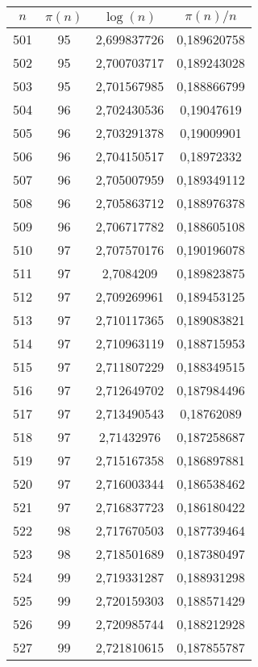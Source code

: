 {\begin{minipage}[!h]{0.45\textwidth}\centering
\tiny
\begin{longtable}{cccc} \hline
\(n\) & \(\pi(n)\) & \(\log(n)\) & \(\pi(n)/n\) \\ \hline
501 & 95 & 2,699837726 & 0,189620758 \\ \hline
502 & 95 & 2,700703717 & 0,189243028 \\ \hline
503 & 95 & 2,701567985 & 0,188866799 \\ \hline
504 & 96 & 2,702430536 & 0,19047619 \\ \hline
505 & 96 & 2,703291378 & 0,19009901 \\ \hline
506 & 96 & 2,704150517 & 0,18972332 \\ \hline
507 & 96 & 2,705007959 & 0,189349112 \\ \hline
508 & 96 & 2,705863712 & 0,188976378 \\ \hline
509 & 96 & 2,706717782 & 0,188605108 \\ \hline
510 & 97 & 2,707570176 & 0,190196078 \\ \hline
511 & 97 & 2,7084209 & 0,189823875 \\ \hline
512 & 97 & 2,709269961 & 0,189453125 \\ \hline
513 & 97 & 2,710117365 & 0,189083821 \\ \hline
514 & 97 & 2,710963119 & 0,188715953 \\ \hline
515 & 97 & 2,711807229 & 0,188349515 \\ \hline
516 & 97 & 2,712649702 & 0,187984496 \\ \hline
517 & 97 & 2,713490543 & 0,18762089 \\ \hline
518 & 97 & 2,71432976 & 0,187258687 \\ \hline
519 & 97 & 2,715167358 & 0,186897881 \\ \hline
520 & 97 & 2,716003344 & 0,186538462 \\ \hline
521 & 97 & 2,716837723 & 0,186180422 \\ \hline
522 & 98 & 2,717670503 & 0,187739464 \\ \hline
523 & 98 & 2,718501689 & 0,187380497 \\ \hline
524 & 99 & 2,719331287 & 0,188931298 \\ \hline
525 & 99 & 2,720159303 & 0,188571429 \\ \hline
526 & 99 & 2,720985744 & 0,188212928 \\ \hline
527 & 99 & 2,721810615 & 0,187855787 \\ \hline

\end{longtable}
\end{minipage}}
